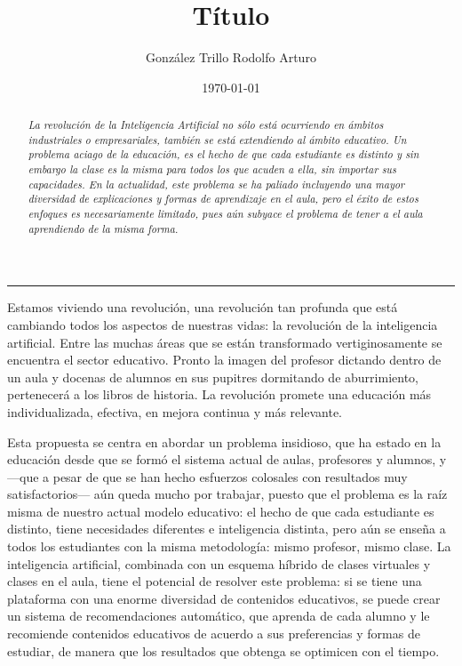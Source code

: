 \documentclass[11pt,a4paper]{markdown}
\author{González Trillo Rodolfo Arturo}
\title{Título}
\date{\today}
\begin{document}
    \maketitle

    \begin{abstract}
       \noindent \textit{
        La revolución de la Inteligencia Artificial no sólo está ocurriendo en ámbitos industriales o empresariales, también se está extendiendo al ámbito educativo. Un problema aciago de la educación, es el hecho de que cada estudiante es distinto y sin embargo la clase es la misma para todos los que acuden a ella, sin importar sus capacidades. En la actualidad, este problema se ha paliado incluyendo una mayor diversidad de explicaciones y formas de aprendizaje en el aula, pero el éxito de estos enfoques es necesariamente limitado, pues aún subyace el problema de tener a el aula aprendiendo de la misma forma. 
        }
   \end{abstract}
  \vspace{1\baselineskip}
  \rule{\textwidth}{2pt}\vspace{2pt}


\quad Estamos viviendo una revolución, una revolución tan profunda que está cambiando todos los aspectos de nuestras vidas: la revolución de la inteligencia artificial. Entre las muchas áreas que se están transformado vertiginosamente se encuentra el sector educativo. Pronto la imagen del profesor dictando dentro de un aula y docenas de alumnos en sus pupitres dormitando de aburrimiento, pertenecerá a los libros de historia. La revolución promete una educación más individualizada, efectiva, en mejora continua y más relevante. 

\quad Esta propuesta se centra en abordar un problema insidioso, que ha estado en la educación desde que se formó el sistema actual de aulas, profesores y alumnos, y —que a pesar de que se han hecho esfuerzos colosales con resultados muy satisfactorios— aún queda mucho por trabajar, puesto que el problema es la raíz misma de nuestro actual modelo educativo: el hecho de que cada estudiante es distinto, tiene necesidades diferentes e inteligencia distinta, pero aún se enseña a todos los estudiantes con la misma metodología: mismo profesor, mismo clase. La inteligencia artificial, combinada con un esquema híbrido de clases virtuales y clases en el aula, tiene el potencial de resolver este problema: si se tiene una plataforma con una enorme diversidad de contenidos educativos, se puede crear un sistema de recomendaciones automático, que aprenda de cada alumno y le recomiende contenidos educativos de acuerdo a sus preferencias y formas de estudiar, de manera que los resultados que obtenga se optimicen con el tiempo.
\end{document}
